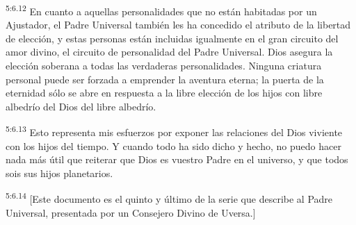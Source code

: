 \par
\textsuperscript{5:6.12} En cuanto a aquellas personalidades que no están habitadas por un Ajustador, el Padre Universal también les ha concedido el atributo de la libertad de elección, y estas personas están incluidas igualmente en el gran circuito del amor divino, el circuito de personalidad del Padre Universal. Dios asegura la elección soberana a todas las verdaderas personalidades. Ninguna criatura personal puede ser forzada a emprender la aventura eterna; la puerta de la eternidad sólo se abre en respuesta a la libre elección de los hijos con libre albedrío del Dios del libre albedrío.

\par
\textsuperscript{5:6.13} Esto representa mis esfuerzos por exponer las relaciones del Dios viviente con los hijos del tiempo. Y cuando todo ha sido dicho y hecho, no puedo hacer nada más útil que reiterar que Dios es vuestro Padre en el universo, y que todos sois sus hijos planetarios.

\par
\textsuperscript{5:6.14} [Este documento es el quinto y último de la serie que describe al Padre Universal, presentada por un Consejero Divino de Uversa.]